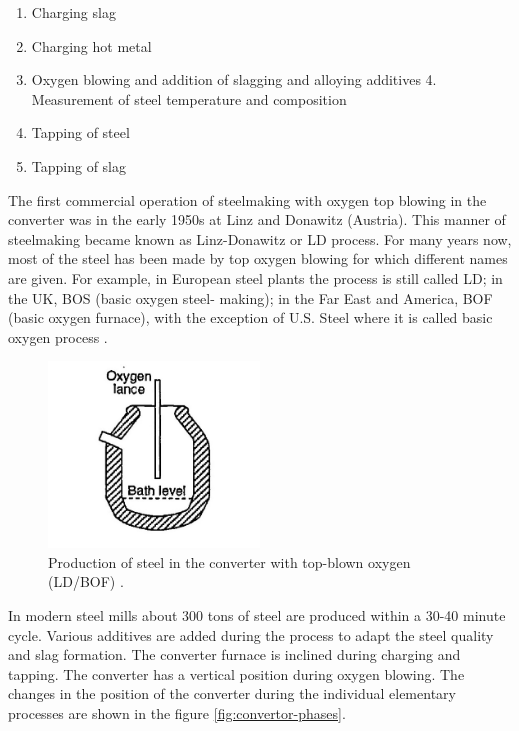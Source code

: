 \begin{enumerate}
\item Charging slag
\item Charging hot metal
\item Oxygen blowing and addition of slagging and alloying additives 4. Measurement of steel temperature and composition
\item Tapping of steel
\item Tapping of slag
\end{enumerate}

The first commercial operation of steelmaking with oxygen top blowing in the converter was in the early 1950s at Linz and Donawitz (Austria). This manner of steelmaking became known as Linz-Donawitz or LD process. For many years now, most of the steel has been made by top oxygen blowing for which different names are given. For example, in European steel plants the process is still called LD; in the UK, BOS (basic oxygen steel- making); in the Far East and America, BOF (basic oxygen furnace), with the exception of U.S. Steel where it is called basic oxygen process \cite{Turkdogan1996}.

\begin{figure}[!ht]
	\label{fig:bof-single}
	\centering
	\includegraphics[width=0.5\textwidth]{figures/bof-single.jpg}
	\caption{Production of steel in the converter with top-blown oxygen (LD/BOF) \citep{Turkdogan1996}.}
\end{figure}

In modern steel mills about 300 tons of steel are produced within a 30-40 minute cycle. Various additives are added during the process to adapt the steel quality and slag formation. The converter furnace is inclined during charging and tapping. The converter has a vertical position during oxygen blowing. The changes in the position of the converter during the individual elementary processes are shown in the figure \ref{fig:convertor-phases}.



